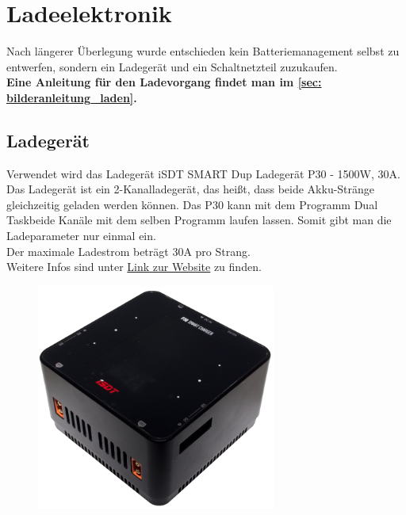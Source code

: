 \section{Ladeelektronik}
Nach längerer Überlegung wurde entschieden kein Batteriemanagement selbst zu entwerfen, sondern ein Ladegerät und ein Schaltnetzteil zuzukaufen. \\

\textbf{Eine Anleitung für den Ladevorgang findet man im \autoref{sec: bilderanleitung_laden}.}


\subsection{Ladegerät}
Verwendet wird das Ladegerät \glqq iSDT SMART Dup Ladegerät P30 - 1500W, 30A\grqq. Das Ladegerät ist ein 2-Kanalladegerät, das heißt, 
dass beide Akku-Stränge gleichzeitig geladen werden können. 
Das P30 kann mit dem Programm \glqq Dual Task\grqq beide Kanäle mit dem selben Programm laufen lassen. Somit gibt man die Ladeparameter nur einmal ein. \\
Der maximale Ladestrom beträgt 30$\mathrm{A}$ pro Strang. \\
Weitere Infos sind unter \href{https://www.modell-hubschrauber.at/Ladegeraete-Netzteile-Ladekabel-und-Zubehoer/Ladegeraete/Ladegeraete-12Volt/iSDT-SMART-Dup-Ladegeraet-P30-1500W-30A-8S-Lipo::43075.html}{Link zur Website} 
zu finden. 

\begin{figure}[H]
    \centering
    \includegraphics[width=0.7\textwidth]{Fotos/SP30_DSC_8784.png}
\end{figure}


